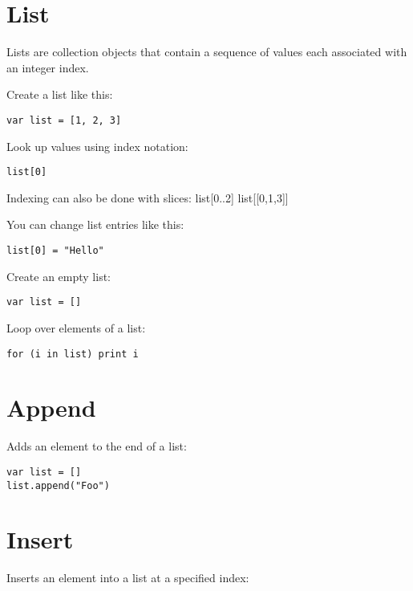 \hypertarget{list}{%
\section{List}\label{list}}

Lists are collection objects that contain a sequence of values each
associated with an integer index.

Create a list like this:

\begin{lstlisting}
var list = [1, 2, 3]
\end{lstlisting}

Look up values using index notation:

\begin{lstlisting}
list[0]
\end{lstlisting}

Indexing can also be done with slices: list{[}0..2{]}
list{[}{[}0,1,3{]}{]}

You can change list entries like this:

\begin{lstlisting}
list[0] = "Hello"
\end{lstlisting}

Create an empty list:

\begin{lstlisting}
var list = []
\end{lstlisting}

Loop over elements of a list:

\begin{lstlisting}
for (i in list) print i
\end{lstlisting}

\hypertarget{append}{%
\section{Append}\label{append}}

Adds an element to the end of a list:

\begin{lstlisting}
var list = []
list.append("Foo")
\end{lstlisting}

\hypertarget{insert}{%
\section{Insert}\label{insert}}

Inserts an element into a list at a specified index:

